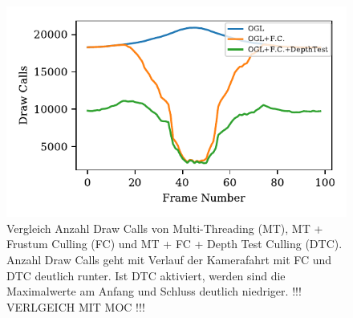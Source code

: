 \documentclass[journal]{vgtc}
\begin{document}
\begin{figure}
	\begin{minipage}{0.4\textwidth}
		\includegraphics[width=1\textwidth]{images/Evaluation_7_Results_OGL_Draw Calls.pdf}
	\end{minipage}
	\begin{minipage}{0.4\textwidth}
		\centering
	\end{minipage}
	\caption{Vergleich Anzahl Draw Calls von Multi-Threading (MT), MT + Frustum Culling (FC) und MT + FC + Depth Test Culling (DTC). Anzahl Draw Calls geht mit Verlauf der Kamerafahrt mit FC und DTC deutlich runter. Ist DTC aktiviert, werden sind die Maximalwerte am Anfang und Schluss deutlich niedriger. !!! VERLGEICH MIT MOC !!!}
	\label{fig:OGL_MOC_frustum_culling}
\end{figure}
\end{document}
